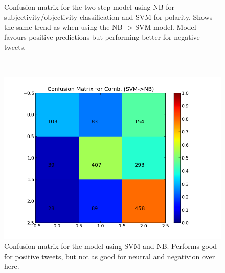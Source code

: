 \begin{minipage}[!htb]{\linewidth}
\begin{minipage}{0.45\linewidth}
\begin{figure}[H]
           \caption[Plot showing the confusion matrix for two-step NB -> MaxEnt]{Confusion matrix for the two-step model using NB for subjectivity/objectivity classification and SVM for polarity. Shows the same trend as when using the NB -> SVM model. Model favours positive predictions but performing better for negative tweets.}
           \label{fig:confmat_nb_maxent}
          \end{figure}
     \end{minipage} \\ 

     \begin{minipage}{0.45\linewidth}
           \begin{figure}[H]
                \includegraphics[width=\linewidth]{../img/plots/grid/confusion_matrix_Comb-SVM-NB.png}
        		\caption[Plot showing the confusion matrix for two-step SVM -> NB]{Confusion matrix for the model using SVM and NB. Performs good for positive tweets, but not as good for neutral and negativion over here.}
            \label{fig:confmat_svm_nb}
           \end{figure}
      \end{minipage}
      \hspace{0.05\linewidth}
      \begin{minipage}{0.45\linewidth}
           \begin{figure}[H]

\end{figure}
\end{minipage}
\end{minipage}
